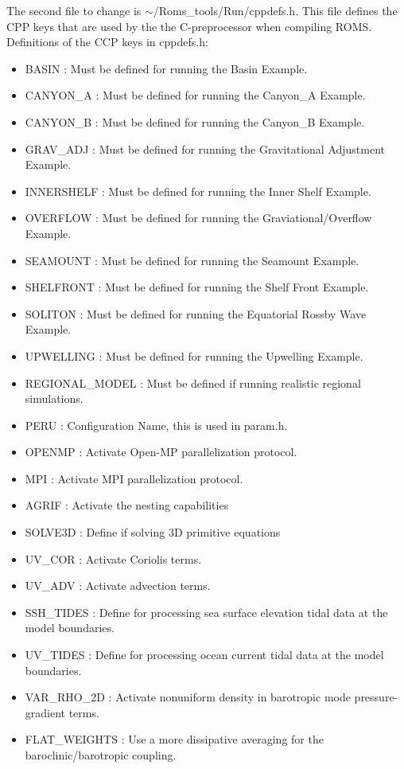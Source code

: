 The second file to change is  $\sim$/Roms\_tools/Run/cppdefs.h.
This file defines the CPP keys that are used by the
the C-preprocessor when compiling ROMS.
Definitions of the CCP keys in cppdefs.h:
\begin{itemize}
\item BASIN     : Must be defined for running the Basin Example.
\item CANYON\_A  : Must be defined for running the Canyon\_A Example.
\item CANYON\_B  : Must be defined for running the Canyon\_B Example.
\item GRAV\_ADJ  : Must be defined for running the Gravitational Adjustment Example.
\item INNERSHELF   : Must be defined for running the Inner Shelf Example.
\item OVERFLOW  : Must be defined for running the Graviational/Overflow Example.
\item SEAMOUNT  : Must be defined for running the Seamount Example.
\item SHELFRONT : Must be defined for running the Shelf Front Example.
\item SOLITON   : Must be defined for running the Equatorial Rossby Wave Example.
\item UPWELLING : Must be defined for running the Upwelling Example.
\item REGIONAL\_MODEL : Must be defined if running realistic regional simulations.
\item PERU :  Configuration Name, this is used in param.h.

\item OPENMP : Activate Open-MP parallelization protocol.
\item MPI : Activate MPI parallelization protocol.
\item AGRIF : Activate the nesting capabilities

\item SOLVE3D : Define if solving 3D primitive equations
\item UV\_COR : Activate Coriolis terms.
\item UV\_ADV : Activate advection terms.
\item SSH\_TIDES : Define for processing sea surface elevation tidal data at the model boundaries.
\item UV\_TIDES :  Define for processing ocean current tidal data at the model boundaries.
\item VAR\_RHO\_2D : Activate nonuniform density in barotropic mode pressure-
 gradient terms.
\item FLAT\_WEIGHTS :  Use a more dissipative averaging for the baroclinic/barotropic coupling.


\end{itemize}
